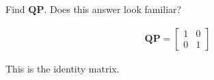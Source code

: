 Find $\boldsymbol{QP}$. Does this answer look familiar?

\begin{solution}
\begin{align*}
    \boldsymbol{QP} = \begin{bmatrix}
        1 & 0 \\
        0 & 1
    \end{bmatrix}
\end{align*}

This is the identity matrix.
\end{solution}